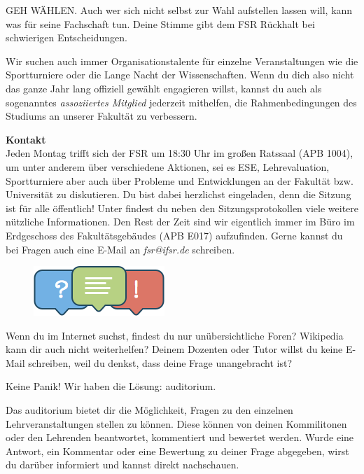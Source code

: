 GEH WÄHLEN.
Auch wer sich nicht selbst zur Wahl aufstellen lassen will, kann was für seine Fachschaft tun.
Deine Stimme gibt dem FSR Rückhalt bei schwierigen Entscheidungen.

Wir suchen auch immer Organisationstalente für einzelne Veranstaltungen wie die Sportturniere oder die Lange Nacht der Wissenschaften.
Wenn du dich also nicht das ganze Jahr lang offiziell gewählt engagieren willst, kannst du auch als sogenanntes \textit{assoziiertes Mitglied} jederzeit mithelfen, die Rahmenbedingungen des Studiums an unserer Fakultät zu verbessern.

\textbf{Kontakt} \\
Jeden Montag trifft sich der FSR um 18:30 Uhr im großen Ratssaal (APB 1004), um unter anderem über verschiedene Aktionen, sei es ESE, Lehrevaluation, Sportturniere aber auch über Probleme und Entwicklungen an der Fakultät bzw. Universität zu diskutieren.
Du bist dabei herzlichst eingeladen, denn die Sitzung ist für alle öffentlich! Unter  findest du neben den Sitzungsprotokollen viele weitere nützliche Informationen.
Den Rest der Zeit sind wir eigentlich immer im Büro im Erdgeschoss des Fakultätsgebäudes (APB E017) aufzufinden.
Gerne kannst du bei Fragen auch eine E-Mail an \textit{fsr@ifsr.de} schreiben.


\begin{figure}
\includegraphics[width=.95\linewidth]{img/auditorium_logo}
\end{figure}

Wenn du im Internet suchst, findest du nur unübersichtliche Foren?
Wikipedia kann dir auch nicht weiterhelfen?
Deinem Dozenten oder Tutor willst du keine E-Mail schreiben, weil du denkst, dass deine Frage unangebracht ist?

Keine Panik!
Wir haben die Lösung: auditorium.

Das auditorium bietet dir die Möglichkeit, Fragen zu den einzelnen Lehrveranstaltungen stellen zu können.
Diese können von deinen Kommilitonen oder den Lehrenden beantwortet, kommentiert und bewertet werden.
Wurde eine Antwort, ein Kommentar oder eine Bewertung zu deiner Frage abgegeben, wirst du darüber informiert und kannst direkt nachschauen.

